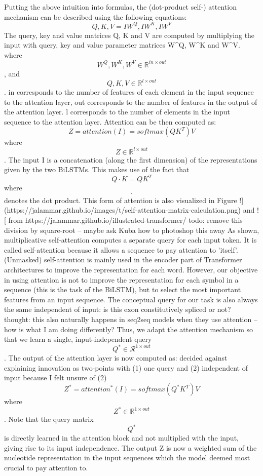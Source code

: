 Putting the above intuition into formulas, the (dot-product self-) attention mechanism can be described using the following equations:
$$Q, K, V = IW^Q, IW^K, IW^V$$
The query, key and value matrices Q, K and V are computed by multiplying the input with query, key and value parameter matrices W^Q, W^K and W^V.
where $$W^Q,W^K, W^V \in \mathbb{R}^{in \times out}$$,
and $$Q,K, V \in \mathbb{R}^{l \times out}$$. in corresponds to the number of features of each element in the input sequence to the attention layer, out corresponds to the number of features in the output of the attention layer. l corresponds to the number of elements in the input sequence to the attention layer.
Attention can be then computed as:
$$Z = attention(I) = softmax(QK^T)V$$
where $$Z \in \mathbb{R}^{l \times out}$$. The input I is a concatenation (along the first dimension) of the representations given by the two BiLSTMs.
This makes use of the fact that $$Q\cdotp K = QK^T$$ where $$\cdotp$$ denotes the dot product.
This form of attention is also visualized in Figure !](https://jalammar.github.io/images/t/self-attention-matrix-calculation.png) and ![
from https://jalammar.github.io/illustrated-transformer/
todo: remove this division by square-root -- maybe ask Kuba how to photoshop this away
As shown, multiplicative self-attention computes a separate query for each input token. It is called self-attention because it allows a sequence to pay attention to 'itself'. (Unmasked) self-attention is mainly used in the encoder part of Transformer architectures to improve the representation for each word.
However, our objective in using attention is not to improve the representation for each symbol in a sequence (this is the task of the BiLSTM), but to select the most important features from an input sequence. The conceptual query for our task is also always the same independent of input: is this exon constitutively spliced or not?
thought: this also naturally happens in seq2seq models when they use attention -- how is what I am doing differently?
Thus, we adapt the attention mechanism so that we learn a single, input-independent query $${Q}^* \in \mathcal{R}^{1 \times out}$$. The output of the attention layer is now computed as:
decided against explaining innovation as two-points with (1) one query and (2) independent of input because I felt unsure of (2)
$$Z^* = {attention}^*(I) = softmax({Q}^*K^T)V$$
where $$Z^* \in \mathbb{R}^{1 \times out}$$. Note that the query matrix $${Q}^*$$ is directly learned in the attention block and not multiplied with the input, giving rise to its input independence. The output Z is now a weighted sum of the nucleotide representation in the input sequences which the model deemed most crucial to pay attention to.
